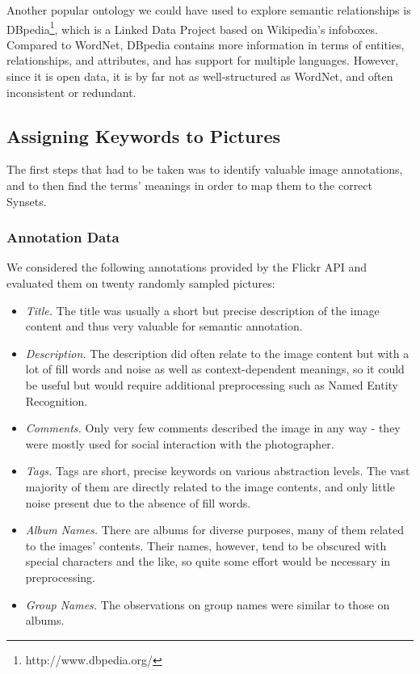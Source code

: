 Another popular ontology we could have used to explore semantic relationships is DBpedia\footnote{http://www.dbpedia.org/}, which is a Linked Data Project based on Wikipedia's infoboxes.
Compared to WordNet, DBpedia contains more information in terms of entities, relationships, and attributes, and has support for multiple languages. However, since it is open data, it is by far not as well-structured as WordNet, and 	often inconsistent or redundant.

\subsection{Assigning Keywords to Pictures}
\label{sec_keywordstopictures}
The first steps that had to be taken was to identify valuable image annotations, and to then find the terms' meanings in order to map them to the correct Synsets.

\subsubsection{Annotation Data}
\label{sec_annotationdata}
We considered the following annotations provided by the Flickr API and evaluated them on twenty randomly sampled pictures:
\begin{itemize}
\item{\emph{Title.}} The title was usually a short but precise description of the image content and thus very valuable for semantic annotation.
\item{\emph{Description.}} The description did often relate to the image content but with a lot of fill words and noise as well as context-dependent meanings, so it could be useful but would require additional preprocessing such as Named Entity Recognition.
\item{\emph{Comments.}} Only very few comments described the image in any way - they were mostly used for social interaction with the photographer.
\item{\emph{Tags.}} Tags are short, precise keywords on various abstraction levels. The vast majority of them are directly related to the image contents, and only little noise present due to the absence of fill words.
\item{\emph{Album Names.}} There are albums for diverse purposes, many of them related to the images' contents. Their names, however, tend to be obscured with special characters and the like, so quite some effort would be necessary in preprocessing.
\item{\emph{Group Names.}} The observations on group names were similar to those on albums.
\end{itemize}

